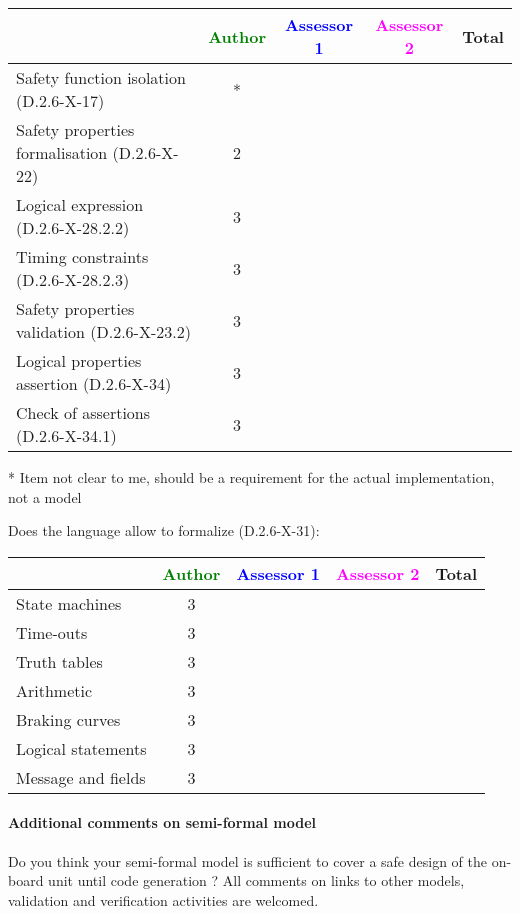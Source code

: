 \begin{tabular}{|l | c | c | c | c|}
\hline
& \textcolor{green}{Author} & \textcolor{blue}{Assessor 1} & \textcolor{magenta}{Assessor 2} & Total \\
\hline 
Safety function isolation (D.2.6-X-17)  &* & & &  \\
\hline 
Safety properties formalisation (D.2.6-X-22)  &2 & & &  \\
\hline
Logical expression (D.2.6-X-28.2.2)  &3 & & &  \\
\hline
Timing constraints (D.2.6-X-28.2.3)  &3 & & &  \\
\hline
Safety properties validation (D.2.6-X-23.2)  &3 & & &  \\
\hline
Logical properties assertion (D.2.6-X-34)  &3 & & &  \\
\hline
Check  of assertions (D.2.6-X-34.1)  &3 & & &  \\
\hline
\end{tabular}

\begin{author_comment}
* Item not clear to me, should be a requirement for the actual implementation, not a model
\end{author_comment}

Does the language allow to  formalize (D.2.6-X-31):

\begin{tabular}{|l | c | c | c | c|}
\hline
& \textcolor{green}{Author} & \textcolor{blue}{Assessor 1} & \textcolor{magenta}{Assessor 2} & Total \\
\hline 
State machines  &3 & & &  \\
\hline
Time-outs  &3 & & &  \\
\hline
Truth tables  &3 & & &  \\
\hline
Arithmetic  &3 & & &  \\
\hline
Braking curves  &3 & & &  \\
\hline
Logical statements &3 & & &  \\
\hline
Message and fields &3 & & &  \\
\hline
\end{tabular}

\paragraph{Additional comments on semi-formal  model} Do you think your semi-formal  model is sufficient to cover a safe design of the on-board unit until code generation ?
All comments on links to  other models, validation and verification activities are welcomed.

